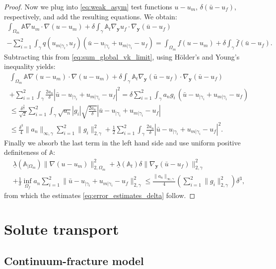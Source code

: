 \documentclass[a4paper]{article}
\def\vc#1{\mathbf{\boldsymbol{#1}}}     %
\def\tn#1{{\mathbb{#1}}}    %
\def\norm#1{\|#1\|}
\def\yy{{\vc y}}
\begin{document}
\begin{proof}
Now we plug into \eqref{eq:weak_asym} test functions $u-u_m$, $\delta(\bar u-u_f)$, respectively, and add the resulting equations.
We obtain:
\begin{multline*}
\int_{\Omega_m}\tn A\nabla u_m\cdot\nabla(u-u_m) + \delta\int_\gamma\tn A_t\nabla_\yy u_f\cdot\nabla_\yy(\bar u-u_f)\\
- \sum_{i=1}^2\int_\gamma q(u_{m|\gamma_i},u_f)(\bar u - u_{|\gamma_i}+u_{m|\gamma_i} - u_f)
= \int_{\Omega_m} f(u-u_m)
+ \delta\int_\gamma\bar f(\bar u-u_f).
\end{multline*}
Subtracting this from \eqref{eq:sum_global_vk_limit}, using H\"older's and Young's inequality yields:
\begin{multline}
\int_{\Omega_m}\tn A\nabla (u-u_m)\cdot\nabla(u-u_m)
+\delta\int_\gamma\tn A_t\nabla_\yy(\bar u-u_f)\cdot\nabla_\yy(\bar u-u_f)\\
+ \sum_{i=1}^2\int_\gamma \frac{2a_n}\delta |\bar u - u_{|\gamma_i} + u_{m|\gamma_i} - u_f|^2
= \delta\sum_{i=1}^2\int_\gamma a_n g_i\, (\bar u - u_{|\gamma_i} + u_{m|\gamma_i} - u_f)\\
\le \frac{\delta^{\frac32}}{\sqrt2}\sum_{i=1}^2\int_\gamma \sqrt{a_n}|g_i|\sqrt{\frac{2a_n}\delta}|\bar u - u_{|\gamma_i} + u_{m|\gamma_i} - u_f|\\
\le \frac{\delta^3}4\norm{a_n}_{\infty,\gamma}\sum_{i=1}^2\norm{g_i}_{2,\gamma}^2 + \frac12\sum_{i=1}^2\int_\gamma \frac{2a_n}\delta |\bar u - u_{|\gamma_i} + u_{m|\gamma_i} - u_f|^2.
\end{multline}
Finally we absorb the last term in the left hand side and use uniform positive definiteness of $\tn A$:
\begin{multline}
\underline\lambda(\tn A_{|\Omega_m})\norm{\nabla (u-u_m)}_{2,\Omega_m}^2
+\underline\lambda(\tn A_t)\delta\norm{\nabla_\yy(\bar u-u_f)}_{2,\gamma}^2\\
+ \frac1\delta\inf_{\Omega_f}a_n\sum_{i=1}^2\norm{\bar u - u_{|\gamma_i} + u_{m|\gamma_i} - u_f}_{2,\gamma}^2
\le \frac{\norm{a_n}_{\infty,\gamma}}4\left(\sum_{i=1}^2\norm{g_i}_{2,\gamma}^2\right)\delta^3,
\end{multline}
from which the estimates \eqref{eq:error_estimates_delta} follow.
\end{proof}

\section{Solute transport}
\subsection{Continuum-fracture model}
\end{document}
